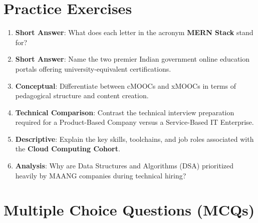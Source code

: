 \section{Practice Exercises}

\begin{practiceset}
\begin{enumerate}[leftmargin=1.5em]
    \item \textbf{Short Answer}: What does each letter in the acronym \textbf{MERN Stack} stand for?
    \item \textbf{Short Answer}: Name the two premier Indian government online education portals offering university-equivalent certifications.
    \item \textbf{Conceptual}: Differentiate between cMOOCs and xMOOCs in terms of pedagogical structure and content creation.
    \item \textbf{Technical Comparison}: Contrast the technical interview preparation required for a Product-Based Company versus a Service-Based IT Enterprise.
    \item \textbf{Descriptive}: Explain the key skills, toolchains, and job roles associated with the \textbf{Cloud Computing Cohort}.
    \item \textbf{Analysis}: Why are Data Structures and Algorithms (DSA) prioritized heavily by MAANG companies during technical hiring?
\end{enumerate}
\end{practiceset}

\section{Multiple Choice Questions (MCQs)}

